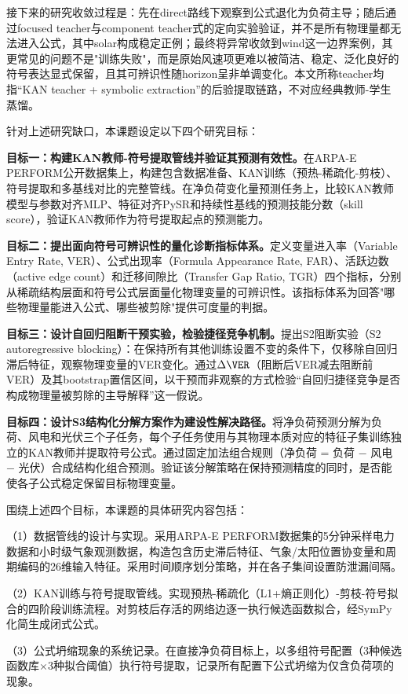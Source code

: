 接下来的研究收敛过程是：先在direct路线下观察到公式退化为负荷主导；随后通过focused teacher与component teacher式的定向实验验证，并不是所有物理量都无法进入公式，其中solar构成稳定正例；最终将异常收敛到wind这一边界案例，其更常见的问题不是"训练失败"，而是原始风速项更难以被简洁、稳定、泛化良好的符号表达显式保留，且其可辨识性随horizon呈非单调变化。本文所称teacher均指``KAN teacher + symbolic extraction''的后验提取链路，不对应经典教师-学生蒸馏。

针对上述研究缺口，本课题设定以下四个研究目标：

\textbf{目标一：构建KAN教师-符号提取管线并验证其预测有效性。}在ARPA-E PERFORM公开数据集上，构建包含数据准备、KAN训练（预热-稀疏化-剪枝）、符号提取和多基线对比的完整管线。在净负荷变化量预测任务上，比较KAN教师模型与参数对齐MLP、特征对齐PySR和持续性基线的预测技能分数（skill score），验证KAN教师作为符号提取起点的预测能力。

\textbf{目标二：提出面向符号可辨识性的量化诊断指标体系。}定义变量进入率（Variable Entry Rate, VER）、公式出现率（Formula Appearance Rate, FAR）、活跃边数（active edge count）和迁移间隙比（Transfer Gap Ratio, TGR）四个指标，分别从稀疏结构层面和符号公式层面量化物理变量的可辨识性。该指标体系为回答"哪些物理量能进入公式、哪些被剪除"提供可度量的判据。

\textbf{目标三：设计自回归阻断干预实验，检验捷径竞争机制。}提出S2阻断实验（S2 autoregressive blocking）：在保持所有其他训练设置不变的条件下，仅移除自回归滞后特征，观察物理变量的VER变化。通过$\Delta\VER$（阻断后VER减去阻断前VER）及其bootstrap置信区间，以干预而非观察的方式检验“自回归捷径竞争是否构成物理量被剪除的主导解释”这一假说。

\textbf{目标四：设计S3结构化分解方案作为建设性解决路径。}将净负荷预测分解为负荷、风电和光伏三个子任务，每个子任务使用与其物理本质对应的特征子集训练独立的KAN教师并提取符号公式。通过固定加法组合规则（净负荷 = 负荷 $-$ 风电 $-$ 光伏）合成结构化组合预测。验证该分解策略在保持预测精度的同时，是否能使各子公式稳定保留目标物理变量。

围绕上述四个目标，本课题的具体研究内容包括：

（1）数据管线的设计与实现。采用ARPA-E PERFORM数据集的5分钟采样电力数据和小时级气象观测数据，构造包含历史滞后特征、气象/太阳位置协变量和周期编码的26维输入特征。采用时间顺序划分策略，并在各子集间设置防泄漏间隔。

（2）KAN训练与符号提取管线。实现预热-稀疏化（L1+熵正则化）-剪枝-符号拟合的四阶段训练流程。对剪枝后存活的网络边逐一执行候选函数拟合，经SymPy化简生成闭式公式。

（3）公式坍缩现象的系统记录。在直接净负荷目标上，以多组符号配置（3种候选函数库$\times$3种拟合阈值）执行符号提取，记录所有配置下公式坍缩为仅含负荷项的现象。

